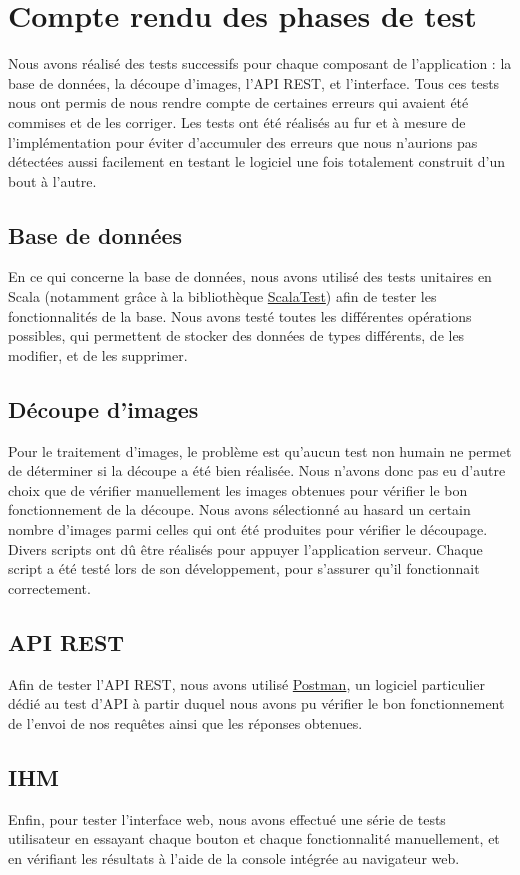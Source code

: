 \chapter{Compte rendu des phases de test}

Nous avons réalisé des tests successifs pour chaque composant de l'application : la base de données, la découpe d'images, l'API REST, et l'interface. Tous ces tests nous ont permis de nous rendre compte de certaines erreurs qui avaient été commises et de les corriger. Les tests ont été réalisés au fur et à mesure de l'implémentation pour éviter d'accumuler des erreurs que nous n'aurions pas détectées aussi facilement en testant le logiciel une fois totalement construit d'un bout à l'autre.

\section{Base de données}
En ce qui concerne la base de données, nous avons utilisé des tests unitaires en Scala (notamment grâce à la bibliothèque \href{http://www.scalatest.org/}{ScalaTest}) afin de tester les fonctionnalités de la base. Nous avons testé toutes les différentes opérations possibles, qui permettent de stocker des données de types différents, de les modifier, et de les supprimer.

\section{Découpe d'images}
Pour le traitement d'images, le problème est qu'aucun test non humain ne permet de déterminer si la découpe a été bien réalisée. Nous n'avons donc pas eu d'autre choix que de vérifier manuellement les images obtenues pour vérifier le bon fonctionnement de la découpe. Nous avons sélectionné au hasard un certain nombre d'images parmi celles qui ont été produites pour vérifier le découpage. Divers scripts ont dû être réalisés pour appuyer l'application serveur. Chaque script a été testé lors de son développement, pour s'assurer qu'il fonctionnait correctement.

\section{API REST}
Afin de tester l'API REST, nous avons utilisé \href{https://www.getpostman.com/}{Postman}, un logiciel particulier dédié au test d'API à partir duquel nous avons pu vérifier le bon fonctionnement de l'envoi de nos requêtes ainsi que les réponses obtenues.

\section{IHM}
Enfin, pour tester l'interface web, nous avons effectué une série de tests utilisateur en essayant chaque bouton et chaque fonctionnalité manuellement, et en vérifiant les résultats à l'aide de la console intégrée au navigateur web.